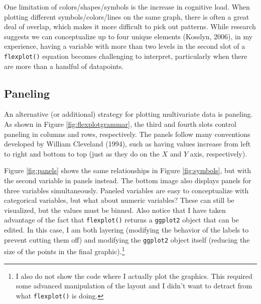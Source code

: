 \documentclass[
  doc]{apa6}
\begin{document}
One limitation of colors/shapes/symbols is the increase in cognitive load. When plotting different symbols/colors/lines on the same graph, there is often a great deal of overlap, which makes it more difficult to pick out patterns. While research suggests we can conceptualize up to four unique elements (Kosslyn, 2006), in my experience, having a variable with more than two levels in the second slot of a \texttt{flexplot()} equation becomes challenging to interpret, particularly when there are more than a handful of datapoints.

\hypertarget{paneling}{%
\subsection{Paneling}\label{paneling}}

An alternative (or additional) strategy for plotting multivariate data is paneling. As shown in Figure \ref{fig:flexplotgrammar}, the third and fourth slots control paneling in columns and rows, respectively. The panels follow many conventions developed by William Cleveland (1994), such as having values increase from left to right and bottom to top (just as they do on the \(X\) and \(Y\) axis, respectively).

Figure \ref{fig:panels} shows the same relationships in Figure \ref{fig:symbols}, but with the second variable in panels instead. The bottom image also displays panels for three variables simultaneously. Paneled variables are easy to conceptualize with categorical variables, but what about numeric variables? These can still be visualized, but the values must be binned. Also notice that I have taken advantage of the fact that \texttt{flexplot()} returns a \texttt{ggplot2} object that can be edited. In this case, I am both layering (modifying the behavior of the labels to prevent cutting them off) and modifying the \texttt{ggplot2} object itself (reducing the size of the points in the final graphic).\footnote{I also do not show the code where I actually plot the graphics. This required some advanced manipulation of the layout and I didn't want to detract from what \texttt{flexplot()} is doing.}
\end{document}
